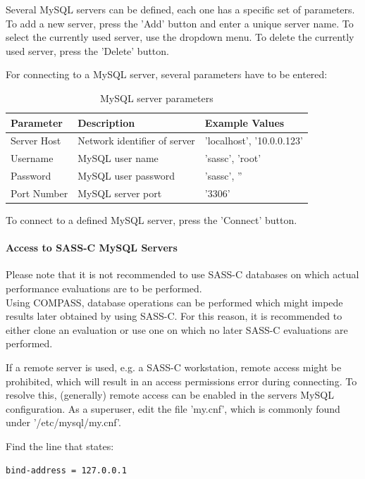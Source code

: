 Several MySQL servers can be defined, each one has a specific set of parameters. To add a new server, press the 'Add' button and enter a unique server name. To select the currently used server, use the dropdown menu. To delete the currently used server, press the 'Delete' button.

For connecting to a MySQL server, several parameters have to be entered:

\begin{table}[H]
  \center
  \begin{tabular}{ | l | l | l |}
    \hline
    \textbf{Parameter} & \textbf{Description} & \textbf{Example Values} \\ \hline
    Server Host & Network identifier of server & 'localhost', '10.0.0.123' \\ \hline
    Username & MySQL user name & 'sassc', 'root' \\ \hline
    Password & MySQL user password & 'sassc', '' \\ \hline
    Port Number & MySQL server port & '3306' \\
    \hline
  \end{tabular}
  \caption{MySQL server parameters}
\end{table}

To connect to a defined MySQL server, press the 'Connect' button.\\

\paragraph{Access to SASS-C MySQL Servers}

Please note that it is not recommended to use SASS-C databases on which actual performance evaluations are to be performed. \\
Using COMPASS, database operations can be performed which might impede results later obtained by using SASS-C. For this reason, it is recommended to either clone an evaluation or use one on which no later SASS-C evaluations are performed.

If a remote server is used, e.g. a SASS-C workstation, remote access might be prohibited, which will result in an access permissions error during connecting. To resolve this, (generally) remote access can be enabled in the servers MySQL configuration. As a superuser, edit the file 'my.cnf', which is commonly found under '/etc/mysql/my.cnf'. 

Find the line that states:
\begin{lstlisting}
bind-address = 127.0.0.1
\end{lstlisting}


